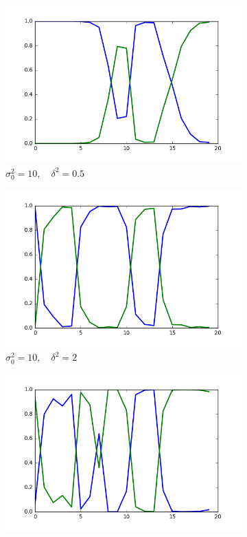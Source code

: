 \documentclass[12pt]{article}
\begin{document}
\begin{figure}[H]
        \begin{subfigure}[b]{0.33\textwidth}
                \includegraphics[width=\linewidth]{init-10_prop-05}
                \caption{$\sigma^2_0=10,\quad \delta^2=0.5$}
                \label{fig:gull}
        \end{subfigure}%
        \begin{subfigure}[b]{0.33\textwidth}
                \includegraphics[width=\linewidth]{init-10_prop-2}
                \caption{$\sigma^2_0=10,\quad \delta^2=2$}
                \label{fig:gull2}
        \end{subfigure}%
        \begin{subfigure}[b]{0.33\textwidth}
                \includegraphics[width=\linewidth]{init-10_prop-5}

\end{subfigure}
\end{figure}
\end{document}
